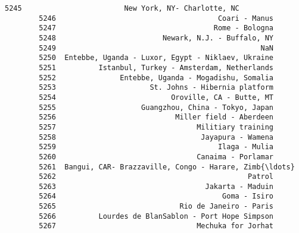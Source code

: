 \documentclass[11pt]{article}
\begin{document}
\begin{Verbatim}[commandchars=\\\{\}]
        5245                        New York, NY- Charlotte, NC   
        5246                                      Coari - Manus   
        5247                                     Rome - Bologna   
        5248                         Newark, N.J. - Buffalo, NY   
        5249                                                NaN   
        5250  Entebbe, Uganda - Luxor, Egypt - Niklaev, Ukraine   
        5251          Istanbul, Turkey - Amsterdam, Netherlands   
        5252               Entebbe, Uganda - Mogadishu, Somalia   
        5253                      St. Johns - Hibernia platform   
        5254                           Oroville, CA - Butte, MT   
        5255                    Guangzhou, China - Tokyo, Japan   
        5256                            Miller field - Aberdeen   
        5257                                 Militiary training   
        5258                                  Jayapura - Wamena   
        5259                                      Ilaga - Mulia   
        5260                                 Canaima - Porlamar   
        5261  Bangui, CAR- Brazzaville, Congo - Harare, Zimb{\ldots}   
        5262                                             Patrol   
        5263                                   Jakarta - Maduin   
        5264                                       Goma - Isiro   
        5265                             Rio de Janeiro - Paris   
        5266          Lourdes de BlanSablon - Port Hope Simpson   
        5267                                 Mechuka for Jorhat   
        

\end{Verbatim}
\end{document}
